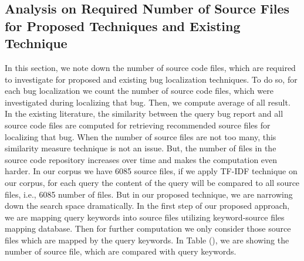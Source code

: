 \documentclass{sig-alternate}
\begin{document}
%
%

\subsection{Analysis on Required Number of Source Files for Proposed Techniques and Existing Technique}
In this section, we note down the number of source code files, which are required to investigate for proposed and existing bug localization techniques. To do so, for each bug localization we count the number of source code files, which were investigated during localizing that bug. Then, we compute average of all result. In the existing literature, the similarity between the query bug report and all source code files are computed for retrieving recommended source files for localizing that bug. When the number of source files are not too many, this similarity measure technique is not an issue. But, the number of files in the source code repository increases over time and makes the computation even harder. In our corpus we have 6085 source files, if we apply TF-IDF technique on our corpus, for each query the content of the query will be compared to all source files, i.e., 6085 number of files. But in our proposed technique, we are narrowing down the search space dramatically. In the first step of our proposed approach, we are mapping query keywords into source files utilizing keyword-source files mapping database. Then for further computation we only consider those source files which are mapped by the query keywords. In Table (), we are showing the number of source file, which are compared with query keywords. 
\end{document}
